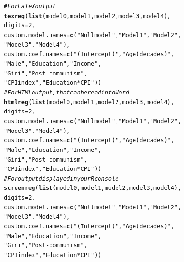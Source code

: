\documentclass[12pt,english]{article}\usepackage[]{graphicx}\usepackage[usenames, dvipsnames]{xcolor}
\makeatletter
\newcommand{\hlnum}[1]{\textcolor[rgb]{0.686,0.059,0.569}{#1}}%
\newcommand{\hlstr}[1]{\textcolor[rgb]{0.192,0.494,0.8}{#1}}%
\newcommand{\hlcom}[1]{\textcolor[rgb]{0.678,0.584,0.686}{\textit{#1}}}%
\newcommand{\hlstd}[1]{\textcolor[rgb]{0.345,0.345,0.345}{#1}}%
\newcommand{\hlkwc}[1]{\textcolor[rgb]{0.333,0.667,0.333}{#1}}%
\newcommand{\hlkwd}[1]{\textcolor[rgb]{0.737,0.353,0.396}{\textbf{#1}}}%
\newenvironment{kframe}{%
 \def\at@end@of@kframe{}%
 \ifinner\ifhmode%
  \def\at@end@of@kframe{\end{minipage}}%
  \begin{minipage}{\columnwidth}%
 \fi\fi%
 \def\FrameCommand##1{\hskip\@totalleftmargin \hskip-\fboxsep
 \colorbox{shadecolor}{##1}\hskip-\fboxsep
     \hskip-\linewidth \hskip-\@totalleftmargin \hskip\columnwidth}%
 \MakeFramed {\advance\hsize-\width
   \@totalleftmargin\z@ \linewidth\hsize
   \@setminipage}}%
 {\par\unskip\endMakeFramed%
 \at@end@of@kframe}
\makeatother
\begin{document}
\begin{kframe}
\begin{alltt}
\hlcom{# For LaTeX output}
\hlkwd{texreg}\hlstd{(}\hlkwd{list}\hlstd{(model0, model1, model2, model3, model4),}
       \hlkwc{digits}\hlstd{=}\hlnum{2}\hlstd{,}
       \hlkwc{custom.model.names}\hlstd{=}\hlkwd{c}\hlstd{(}\hlstr{"Null model"}\hlstd{,} \hlstr{"Model 1"}\hlstd{,} \hlstr{"Model 2"}\hlstd{,}
                            \hlstr{"Model 3"}\hlstd{,} \hlstr{"Model 4"}\hlstd{),}
       \hlkwc{custom.coef.names}\hlstd{=}\hlkwd{c}\hlstd{(}\hlstr{"(Intercept)"}\hlstd{,} \hlstr{"Age (decades)"}\hlstd{,}
                           \hlstr{"Male"}\hlstd{,} \hlstr{"Education"}\hlstd{,} \hlstr{"Income"}\hlstd{,}
                           \hlstr{"Gini"}\hlstd{,} \hlstr{"Post-communism"}\hlstd{,}
                           \hlstr{"CPI index"}\hlstd{,}\hlstr{"Education*CPI"}\hlstd{))}
\hlcom{# For HTML output, that can be read into Word}
\hlkwd{htmlreg}\hlstd{(}\hlkwd{list}\hlstd{(model0, model1, model2, model3, model4),}
        \hlkwc{digits}\hlstd{=}\hlnum{2}\hlstd{,}
        \hlkwc{custom.model.names}\hlstd{=}\hlkwd{c}\hlstd{(}\hlstr{"Null model"}\hlstd{,} \hlstr{"Model 1"}\hlstd{,} \hlstr{"Model 2"}\hlstd{,}
                             \hlstr{"Model 3"}\hlstd{,} \hlstr{"Model 4"}\hlstd{),}
        \hlkwc{custom.coef.names}\hlstd{=}\hlkwd{c}\hlstd{(}\hlstr{"(Intercept)"}\hlstd{,} \hlstr{"Age (decades)"}\hlstd{,}
                            \hlstr{"Male"}\hlstd{,} \hlstr{"Education"}\hlstd{,} \hlstr{"Income"}\hlstd{,}
                            \hlstr{"Gini"}\hlstd{,} \hlstr{"Post-communism"}\hlstd{,}
                            \hlstr{"CPI index"}\hlstd{,}\hlstr{"Education*CPI"}\hlstd{))}
\hlcom{# For output displayed in your R console}
\hlkwd{screenreg}\hlstd{(}\hlkwd{list}\hlstd{(model0, model1, model2, model3, model4),}
          \hlkwc{digits}\hlstd{=}\hlnum{2}\hlstd{,}
          \hlkwc{custom.model.names}\hlstd{=}\hlkwd{c}\hlstd{(}\hlstr{"Null model"}\hlstd{,} \hlstr{"Model 1"}\hlstd{,} \hlstr{"Model 2"}\hlstd{,}
                               \hlstr{"Model 3"}\hlstd{,} \hlstr{"Model 4"}\hlstd{),}
          \hlkwc{custom.coef.names}\hlstd{=}\hlkwd{c}\hlstd{(}\hlstr{"(Intercept)"}\hlstd{,} \hlstr{"Age (decades)"}\hlstd{,}
                              \hlstr{"Male"}\hlstd{,} \hlstr{"Education"}\hlstd{,} \hlstr{"Income"}\hlstd{,}
                              \hlstr{"Gini"}\hlstd{,} \hlstr{"Post-communism"}\hlstd{,}
                              \hlstr{"CPI index"}\hlstd{,}\hlstr{"Education*CPI"}\hlstd{))}
\end{alltt}
\end{kframe}
\end{document}
